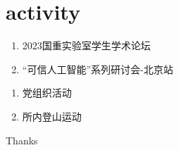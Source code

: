 \documentclass[aspectratio=1610,18pt]{ctexbeamer}
\begin{document}
\section{activity}
\begin{frame}
  \begin{enumerate}
    \item 2023国重实验室学生学术论坛
    \item “可信人工智能”系列研讨会-北京站
  \end{enumerate}
\end{frame}
\begin{frame}
  \begin{enumerate}
    \item 党组织活动
    \item 所内登山运动
  \end{enumerate}
\end{frame}
\begin{frame}
  \centering
  \Huge{Thanks}
\end{frame}
\end{document}

